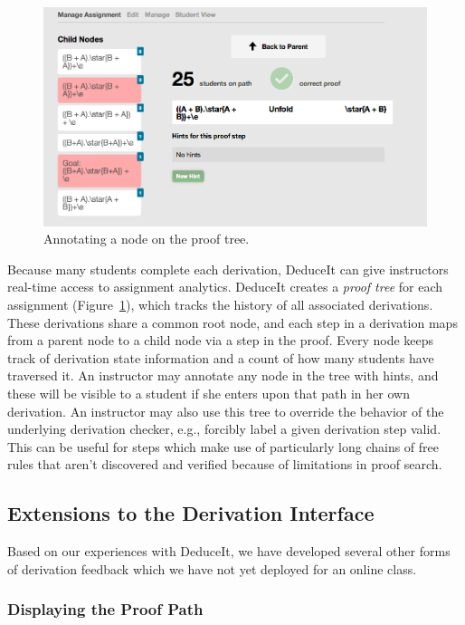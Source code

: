 \documentclass{sigchi}
\begin{document}
\begin{figure}[tb]
\centering
\includegraphics[width=1\columnwidth]{nodeannote}
\caption{Annotating a node on the proof tree.}
\label{fig:nodeannote}
\end{figure}

Because many students complete each derivation, DeduceIt can give instructors real-time access to assignment analytics. DeduceIt creates a \emph{proof tree} for each assignment (Figure~\ref{fig:nodeannote}), which tracks the history of all associated derivations. These derivations share a common root node, and each step in a derivation maps from a parent node to a child node via a step in the proof. Every node keeps track of derivation state information and a count of how many students have traversed it. An instructor may annotate any node in the tree with hints, and these will be visible to a student if she enters upon that path in her own derivation. An instructor may also use this tree to override the behavior of the underlying derivation checker, e.g., forcibly label a given derivation step valid. This can be useful for steps which make use of particularly long chains of free rules that aren't discovered and verified because of limitations in proof search.

\subsection{Extensions to the Derivation Interface}

Based on our experiences with DeduceIt, we have developed several other forms of derivation feedback which we have not yet deployed for an online class.

\subsubsection{Displaying the Proof Path}
\end{document}
